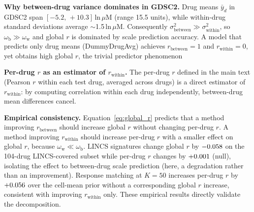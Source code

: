 \textbf{Why between-drug variance dominates in GDSC2.}
Drug means $\bar{y}_d$ in GDSC2 span $[-5.2,\, +10.3]$\,ln\,$\mu$M (range 15.5 units), while within-drug standard deviations average $\sim$1.5\,ln\,$\mu$M.
Consequently $\sigma^2_{\mathrm{between}} \gg \sigma^2_{\mathrm{within}}$, so $\omega_{\mathrm{b}} \gg \omega_{\mathrm{w}}$ and global $r$ is dominated by scale prediction accuracy.
A model that predicts only drug means (DummyDrugAvg) achieves $r_{\mathrm{between}} = 1$ and $r_{\mathrm{within}} = 0$, yet obtains high global $r$, the trivial predictor phenomenon\cite{specgame2025}

\textbf{Per-drug $r$ as an estimator of $r_{\mathrm{within}}$.}
The per-drug $r$ defined in the main text (Pearson $r$ within each test drug, averaged across drugs) is a direct estimator of $r_{\mathrm{within}}$: by computing correlation within each drug independently, between-drug mean differences cancel.

\textbf{Empirical consistency.}
Equation~\ref{eq:global_r} predicts that a method improving $r_{\mathrm{between}}$ should increase global $r$ without changing per-drug $r$. A method improving $r_{\mathrm{within}}$ should increase per-drug $r$ with a smaller effect on global $r$, because $\omega_{\mathrm{w}} \ll \omega_{\mathrm{b}}$.
LINCS signatures change global $r$ by $-0.058$ on the 104-drug LINCS-covered subset while per-drug $r$ changes by $+0.001$ (null), isolating the effect to between-drug scale prediction (here, a degradation rather than an improvement).
Response matching at $K = 50$ increases per-drug $r$ by $+0.056$ over the cell-mean prior without a corresponding global $r$ increase, consistent with improving $r_{\mathrm{within}}$ only.
These empirical results directly validate the decomposition.
